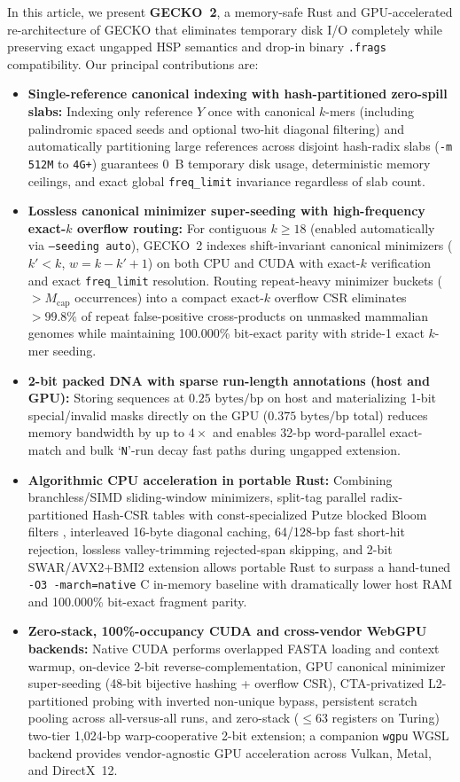 \documentclass[pdflatex,sn-vancouver,Numbered]{sn-jnl}
\newcommand{\hlExactParityPct}{100.000\%}
\begin{document}
In this article, we present \textbf{GECKO~2}, a memory-safe Rust and GPU-accelerated re-architecture of GECKO that eliminates temporary disk I/O completely while preserving exact ungapped HSP semantics and drop-in binary \texttt{.frags} compatibility. Our principal contributions are:
\begin{itemize}
    \item \textbf{Single-reference canonical indexing with hash-partitioned zero-spill slabs:} Indexing only reference $Y$ once with canonical $k$-mers (including palindromic spaced seeds and optional two-hit diagonal filtering) and automatically partitioning large references across disjoint hash-radix slabs (\texttt{-m 512M} to \texttt{4G+}) guarantees 0~B temporary disk usage, deterministic memory ceilings, and exact global \texttt{freq\_limit} invariance regardless of slab count.
    \item \textbf{Lossless canonical minimizer super-seeding with high-frequency exact-$k$ overflow routing:} For contiguous $k \ge 18$ (enabled automatically via \texttt{--seeding auto}), GECKO~2 indexes shift-invariant canonical minimizers ($k' < k$, $w = k - k' + 1$) on both CPU and CUDA with exact-$k$ verification and exact \texttt{freq\_limit} resolution. Routing repeat-heavy minimizer buckets ($> M_{\text{cap}}$ occurrences) into a compact exact-$k$ overflow CSR eliminates $>99.8\%$ of repeat false-positive cross-products on unmasked mammalian genomes while maintaining 100.000\% bit-exact parity with stride-1 exact $k$-mer seeding.
    \item \textbf{2-bit packed DNA with sparse run-length annotations (host and GPU):} Storing sequences at $0.25\text{ bytes/bp}$ on host and materializing 1-bit special/invalid masks directly on the GPU ($0.375\text{ bytes/bp}$ total) reduces memory bandwidth by up to $4\times$ and enables 32-bp word-parallel exact-match and bulk `\texttt{N}'-run decay fast paths during ungapped extension.
    \item \textbf{Algorithmic CPU acceleration in portable Rust:} Combining branchless/SIMD sliding-window minimizers, split-tag parallel radix-partitioned Hash-CSR tables with const-specialized Putze blocked Bloom filters \cite{putze2009bloom}, interleaved 16-byte diagonal caching, 64/128-bp fast short-hit rejection, lossless valley-trimming rejected-span skipping, and 2-bit SWAR/AVX2+BMI2 extension allows portable Rust to surpass a hand-tuned \texttt{-O3 -march=native} C in-memory baseline with dramatically lower host RAM and \hlExactParityPct{} bit-exact fragment parity.
    \item \textbf{Zero-stack, 100\%-occupancy CUDA and cross-vendor WebGPU backends:} Native CUDA performs overlapped FASTA loading and context warmup, on-device 2-bit reverse-complementation, GPU canonical minimizer super-seeding (48-bit bijective hashing + overflow CSR), CTA-privatized L2-partitioned probing with inverted non-unique bypass, persistent scratch pooling across all-versus-all runs, and zero-stack ($\le 63$ registers on Turing) two-tier 1,024-bp warp-cooperative 2-bit extension; a companion \texttt{wgpu} WGSL backend provides vendor-agnostic GPU acceleration across Vulkan, Metal, and DirectX~12.
\end{itemize}
\end{document}
